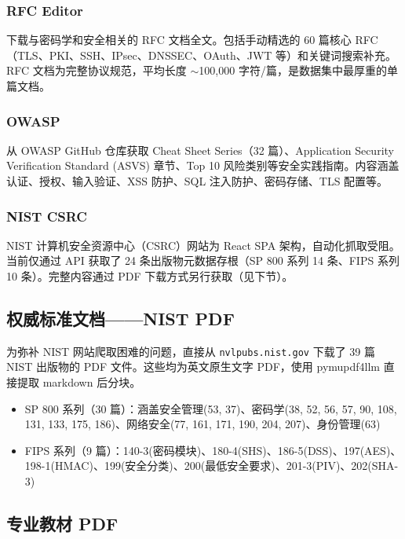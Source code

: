 \documentclass[12pt,a4paper]{ctexart}
\begin{document}
\subsubsection*{RFC Editor}

下载与密码学和安全相关的 RFC 文档全文。包括手动精选的 60 篇核心 RFC（TLS、PKI、SSH、IPsec、DNSSEC、OAuth、JWT 等）和关键词搜索补充。RFC 文档为完整协议规范，平均长度 $\sim$100,000 字符/篇，是数据集中最厚重的单篇文档。

\subsubsection*{OWASP}

从 OWASP GitHub 仓库获取 Cheat Sheet Series（32 篇）、Application Security Verification Standard (ASVS) 章节、Top 10 风险类别等安全实践指南。内容涵盖认证、授权、输入验证、XSS 防护、SQL 注入防护、密码存储、TLS 配置等。

\subsubsection*{NIST CSRC}

NIST 计算机安全资源中心（CSRC）网站为 React SPA 架构，自动化抓取受阻。当前仅通过 API 获取了 24 条出版物元数据存根（SP 800 系列 14 条、FIPS 系列 10 条）。完整内容通过 PDF 下载方式另行获取（见下节）。

\subsection{权威标准文档——NIST PDF}

为弥补 NIST 网站爬取困难的问题，直接从 \texttt{nvlpubs.nist.gov} 下载了 39 篇 NIST 出版物的 PDF 文件。这些均为英文原生文字 PDF，使用 pymupdf4llm 直接提取 markdown 后分块。

\begin{itemize}
    \item SP 800 系列（30 篇）：涵盖安全管理(53, 37)、密码学(38, 52, 56, 57, 90, 108, 131, 133, 175, 186)、网络安全(77, 161, 171, 190, 204, 207)、身份管理(63)
    \item FIPS 系列（9 篇）：140-3(密码模块)、180-4(SHS)、186-5(DSS)、197(AES)、198-1(HMAC)、199(安全分类)、200(最低安全要求)、201-3(PIV)、202(SHA-3)
\end{itemize}

\subsection{专业教材 PDF}
\end{document}
